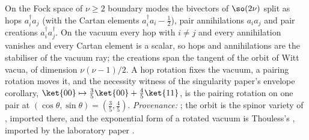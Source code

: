 On the Fock space of $\nu \geq 2$ boundary modes the bivectors of $\so(2\nu)$ split as hops $a_i^{\dagger}a_j$ (with the Cartan elements $a_i^{\dagger}a_i - \tfrac12$), pair annihilations $a_ia_j$ and pair creations $a_i^{\dagger}a_j^{\dagger}$. On the vacuum every hop with $i \neq j$ and every annihilation vanishes and every Cartan element is a scalar, so hops and annihilations are the stabiliser of the vacuum ray; the creations span the tangent of the orbit of Witt vacua, of dimension $\nu(\nu-1)/2$. A hop rotation fixes the vacuum, a pairing rotation moves it, and the necessity witness of the singularity paper's envelope corollary, $\ket{00} \mapsto \tfrac35\ket{00} + \tfrac45\ket{11}$, is the pairing rotation on one pair at $(\cos\theta, \sin\theta) = (\tfrac35, \tfrac45)$. \emph{Provenance:} \cite[Prop.~13.4, Cor.~11.6]{ButlerT5}; the orbit is the spinor variety of \cite{Cartan1938, Chevalley1954}, imported there, and the exponential form of a rotated vacuum is Thouless's \cite{Thouless1960}, imported by the laboratory paper \cite[Fact~2.10]{ButlerT16}.
